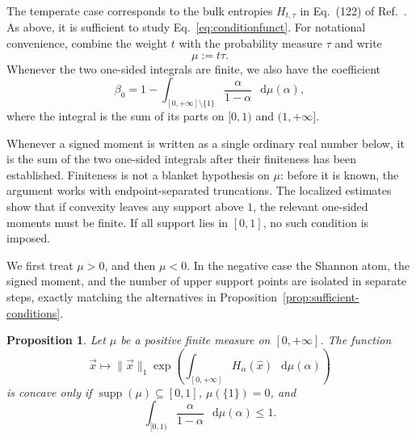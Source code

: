 \documentclass[11pt]{article}
\newtheorem{proposition}[theorem]{Proposition}
\theoremstyle{definition}
\def\d{\mathop{}\!\mathrm{d}}
\begin{document}
The temperate case corresponds to the bulk entropies $H_{t,\tau}$ in Eq.~(122) of
Ref.~\cite{rubboli2026complete}.  As above, it is sufficient to study
Eq.~\eqref{eq:conditionfunct}.  For notational convenience, combine the weight
$t$ with the probability measure $\tau$ and write
\begin{equation}
\mu:=t\tau.
\end{equation}
Whenever the two one-sided integrals are finite, we also have the coefficient
\begin{equation}
\label{eq:definition-beta0}
\beta_0=1-
\int_{[0,+\infty]\setminus\{1\}}
\frac{\alpha}{1-\alpha}\,\d\mu(\alpha),
\end{equation}
where the integral is the sum of its parts on $[0,1)$ and $(1,+\infty]$.

Whenever a signed moment is written as a single ordinary real number below, it is
the sum of the two one-sided integrals after their finiteness has been established.
Finiteness is not a blanket hypothesis on $\mu$: before it is known, the argument
works with endpoint-separated truncations.  The localized estimates show that if
convexity leaves any support above $1$, the relevant one-sided moments must be
finite.  If all support lies in $[0,1]$, no such condition is imposed.

We first treat $\mu>0$, and then $\mu<0$.  In the negative case the Shannon atom,
the signed moment, and the number of upper support points are isolated in separate
steps, exactly matching the alternatives in
Proposition~\ref{prop:sufficient-conditions}.

\begin{proposition}
\label{prop:first-measure}
Let $\mu$ be a positive finite measure on $[0,+\infty]$.  The function
\begin{equation}
\vec{x}\longmapsto\|\vec{x}\|_1
\exp\!\left(\int_{[0,+\infty]}H_\alpha(\hat{x})\,
\d\mu(\alpha)\right)
\end{equation}
is concave only if
$\operatorname{supp}(\mu)\subseteq[0,1]$, $\mu(\{1\})=0$, and
\begin{equation}
\int_{[0,1)}\frac{\alpha}{1-\alpha}\,\d\mu(\alpha)\leq1.
\end{equation}
\end{proposition}
\end{document}
